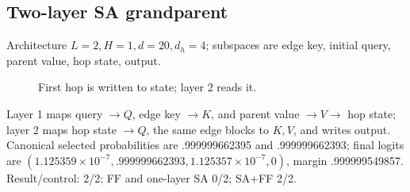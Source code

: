 \documentclass[10pt]{article}
\begin{document}
\subsection{Two-layer SA grandparent}
Architecture $L=2,H=1,d=20,d_h=4$; subspaces are edge key, initial query, parent value, hop state, output.
\begin{figure}[H]\centering{}\caption{First hop is written to state; layer 2 reads it.}\end{figure}
Layer 1 maps query $\to Q$, edge key $\to K$, and parent value $\to V\to$ hop state; layer 2 maps hop state $\to Q$, the same edge blocks to $K,V$, and writes output. Canonical selected probabilities are .999999662395 and .999999662393; final logits are $(1.125359\!\times\!10^{-7},.999999662393,1.125357\!\times\!10^{-7},0)$, margin .999999549857. Result/control: 2/2; FF and one-layer SA 0/2; SA+FF 2/2.
\end{document}

